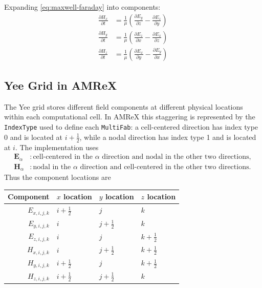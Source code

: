 \documentclass{article}
\numberwithin{equation}{section}
\numberwithin{figure}{section}
\begin{document}
Expanding \eqref{eq:maxwell-faraday} into components:
\begin{subequations}\label{eq:h-components}
    \begin{align}
        \frac{\partial H_x}{\partial t} & = \frac{1}{\mu} \left( \frac{\partial E_y}{\partial z} - \frac{\partial E_z}{\partial y} \right)
        \label{eq:h-x-component}                                                                                                           \\
        \frac{\partial H_y}{\partial t} & = \frac{1}{\mu} \left( \frac{\partial E_z}{\partial x} - \frac{\partial E_x}{\partial z} \right)
        \label{eq:h-y-component}                                                                                                           \\
        \frac{\partial H_z}{\partial t} & = \frac{1}{\mu} \left( \frac{\partial E_x}{\partial y} - \frac{\partial E_y}{\partial x} \right)
        \label{eq:h-z-component}
    \end{align}
\end{subequations}

\subsection{Yee Grid in AMReX}

The Yee grid stores different field components at different physical locations within each computational cell. In AMReX this staggering is represented by the \texttt{IndexType} used to define each \texttt{MultiFab}: a cell-centered direction has index type 0 and is located at $i+\frac{1}{2}$, while a nodal direction has index type 1 and is located at $i$. The implementation uses
\begin{align*}
    \mathbf{E}_\alpha & : \text{cell-centered in the } \alpha \text{ direction and nodal in the other two directions}, \\
    \mathbf{H}_\alpha & : \text{nodal in the } \alpha \text{ direction and cell-centered in the other two directions}.
\end{align*}
Thus the component locations are
\begin{center}
    \begin{tabular}{r|lll}
        Component     & $x$ location    & $y$ location    & $z$ location    \\
        \hline
        $E_{x,i,j,k}$ & $i+\frac{1}{2}$ & $j$             & $k$             \\
        $E_{y,i,j,k}$ & $i$             & $j+\frac{1}{2}$ & $k$             \\
        $E_{z,i,j,k}$ & $i$             & $j$             & $k+\frac{1}{2}$ \\
        \hline
        $H_{x,i,j,k}$ & $i$             & $j+\frac{1}{2}$ & $k+\frac{1}{2}$ \\
        $H_{y,i,j,k}$ & $i+\frac{1}{2}$ & $j$             & $k+\frac{1}{2}$ \\
        $H_{z,i,j,k}$ & $i+\frac{1}{2}$ & $j+\frac{1}{2}$ & $k$
    \end{tabular}
\end{center}
\end{document}
